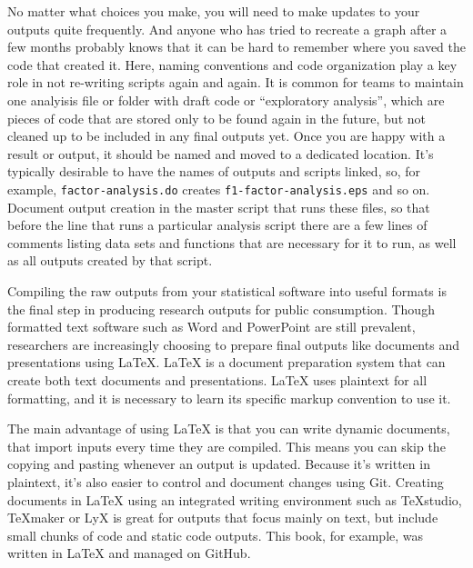 No matter what choices you make,
you will need to make updates to your outputs quite frequently.
And anyone who has tried to recreate a graph after a few months probably knows
that it can be hard to remember where you saved the code that created it.
Here, naming conventions and code organization play a key role
in not re-writing scripts again and again.
It is common for teams to maintain one analyisis file or folder with draft code or ``exploratory analysis'',
which are pieces of code that are stored only to be found again in the future,
but not cleaned up to be included in any final outputs yet.
Once you are happy with a result or output,
it should be named and moved to a dedicated location.
It's typically desirable to have the names of outputs and scripts linked,
so, for example, \texttt{factor-analysis.do} creates \texttt{f1-factor-analysis.eps} and so on.
Document output creation in the master script that runs these files,
so that before the line that runs a particular analysis script
there are a few lines of comments listing
data sets and functions that are necessary for it to run,
as well as all outputs created by that script.

Compiling the raw outputs from your statistical software into useful formats
is the final step in producing research outputs for public consumption.
Though formatted text software such as Word and PowerPoint are still prevalent,
researchers are increasingly choosing to prepare final outputs
like documents and presentations using {\LaTeX}\index{{\LaTeX}}.
{\LaTeX} is a document preparation system that can create both text documents and presentations.
 {\LaTeX} uses plaintext for all formatting,
and it is necessary to learn its specific markup convention to use it.

The main advantage of using {\LaTeX} is that you can write dynamic documents,
that import inputs every time they are compiled.
This means you can skip the copying and pasting whenever an output is updated.
Because it's written in plaintext, it's also easier to control and document changes using Git.
Creating documents in {\LaTeX} using an integrated writing environment such as TeXstudio, TeXmaker or LyX
is great for outputs that focus mainly on text,
but include small chunks of code and static code outputs.
This book, for example, was written in {\LaTeX} and managed on GitHub.

